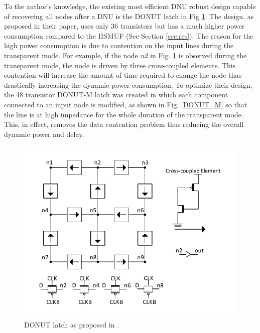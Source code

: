 To the author's knowledge, the existing most efficient DNU robust design capable of recovering all nodes after a DNU is the DONUT latch \cite{DONUT} in Fig \ref{fig:DONUT}. The design, as proposed in their paper, uses only 36 transistors but has a much higher power consumption compared to the HSMUF (See Section \ref{sec:res}). The reason for the high power consumption is due to contention on the input lines during the transparent mode. For example, if the node \textit{n2} in Fig. \ref{fig:DONUT} is observed during the transparent mode, the node is driven by three cross-coupled elements. This contention will increase the amount of time required to change the node thus drastically increasing the dynamic power consumption. To optimize their design, the 48 transistor DONUT-M latch was created in which each component connected to an input node is modified, as shown in Fig. \ref{DONUT_M} so that the line is at high impedance for the whole duration of the transparent mode. This, in effect, removes the data contention problem thus reducing the overall dynamic power and delay.  

\begin{figure}[htbp]
	\centering
	\includegraphics[width=0.65\linewidth]{Figures/DONUT}
	\caption{DONUT latch as proposed in \cite{DONUT}.}
	\label{fig:DONUT}
\end{figure}


